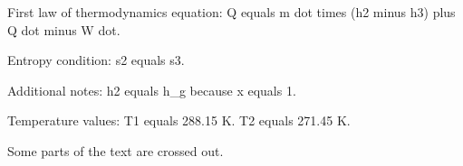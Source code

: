 First law of thermodynamics equation:  
Q equals m dot times (h2 minus h3) plus Q dot minus W dot.  

Entropy condition:  
s2 equals s3.  

Additional notes:  
h2 equals h_g because x equals 1.  

Temperature values:  
T1 equals 288.15 K.  
T2 equals 271.45 K.  

Some parts of the text are crossed out.